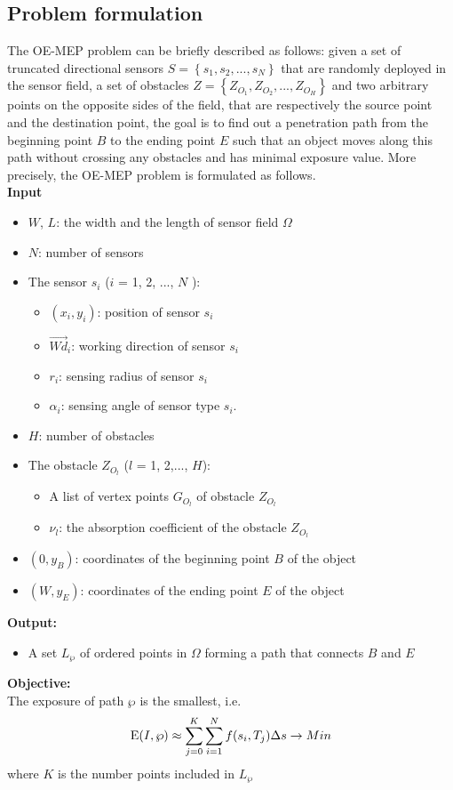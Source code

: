 \documentclass[final]{elsarticle}
\begin{document}
\subsection{Problem formulation}
The OE-MEP problem can be briefly described as follows: given a set of truncated directional sensors $S = \left\{ {{s_1},{s_2},...,{s_N}} \right\}$ that are randomly deployed in the sensor field, a set of obstacles $Z = \left\{ {{Z_{O_1}},{Z_{O_2}},...,{Z_{O_H}}} \right\}$ and two arbitrary points on the opposite sides of the field, that are respectively the source point and the destination point, the goal is to find out a penetration path from the beginning point $B$ to the ending point $E$ such that an object moves along this path without crossing any obstacles and has minimal exposure value. More precisely, the OE-MEP problem is formulated as follows.\\
\textbf{Input}
\begin{itemize}
		\itemsep-0.2em
		\item $W$, $L$: the width and the length of sensor field $\Omega$
		\item $N$: number of sensors
		\item The sensor $s_i$ ($ i $ = 1, 2, ..., $ N $ ):
		\begin{itemize}
			 \item $({x_i},y_i)$: position of sensor $ s_i $
			 \item $\overrightarrow{Wd}_i$: working direction of sensor $s_i$
			 \item $ r_i $: sensing radius of sensor $ s_i $
			 \item ${\alpha _i}$: sensing angle of sensor type $ s_i $.
		 \end{itemize}
		 \item $H$: number of obstacles
		 \item The obstacle $Z_{O_l}$ ($ l $ = 1, 2,..., $H$): 
		 \begin{itemize}
		 	\item A list of vertex points $ G_{O_l} $ of obstacle $Z_{O_l}$
		 	\item $ \nu_l $: the absorption coefficient of the obstacle $Z_{O_l}$
		 \end{itemize}
		\item $(0, y_B)$: coordinates of the beginning point $B$ of the object
		\item $(W, y_E)$: coordinates of the ending point $E$ of the object
\end{itemize}
\textbf{Output:}
\begin{itemize}
	\item A set ${L_\wp }$ of ordered points in $\Omega $ forming a path that connects $ B $ and $ E $ 
\end{itemize}
\textbf{Objective:}\\
The exposure of path  $\wp $ is the smallest, i.e.
\begin{equation}
\label{eq9}
{\rm E}(I,\wp )  \approx \sum\limits_{j = 0}^K {\sum\limits_{i = 1}^N {f({s_i},{T_j})} } \Delta s  \to Min
\end{equation}
where $ K $ is the number points included in ${L_\wp }$
\end{document}
